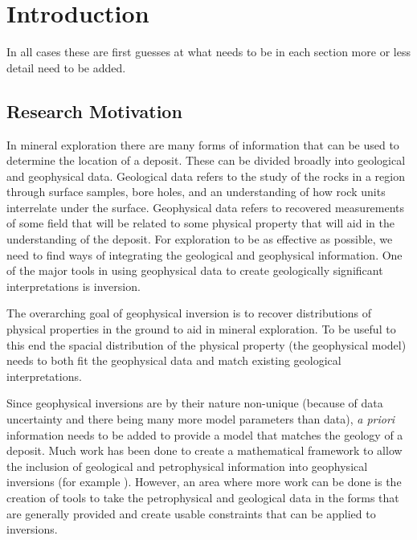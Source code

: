 
\chapter{Introduction}
\label{ch:Introduction}

\begin{epigraph}
\end{epigraph}

In all cases these are first guesses at what needs to be in each section more or less detail need to be added.

\section{Research Motivation}
\label{sec:Research Motivation}

In mineral exploration there are many forms of information that can be used to determine the location of a deposit. These can be divided broadly into geological and geophysical data. Geological data refers to the study of the rocks in a region through surface samples, bore holes, and an understanding of how rock units interrelate under the surface. Geophysical data refers to recovered measurements of some field that will be related to some physical property that will aid in the understanding of the deposit. For exploration to be as effective as possible, we need to find ways of integrating the geological and geophysical information. One of the major tools in using geophysical data to create geologically significant interpretations is inversion.

The overarching goal of geophysical inversion is to recover distributions of physical properties in the ground to aid in mineral exploration. To be useful to this end the spacial distribution of the physical property (the geophysical model) needs to both fit the geophysical data and match existing geological interpretations. 

Since geophysical inversions are by their nature non-unique (because of data uncertainty and there being many more model parameters than data), \emph{a priori} information needs to be added to provide a model that matches the geology of a deposit. Much work has been done to create a mathematical framework to allow the inclusion of geological and petrophysical information into geophysical inversions (for example \citep{li19963}). However, an area where more work can be done is the creation of tools to take the petrophysical and geological data in the forms that are generally provided and create usable constraints that can be applied to inversions.

